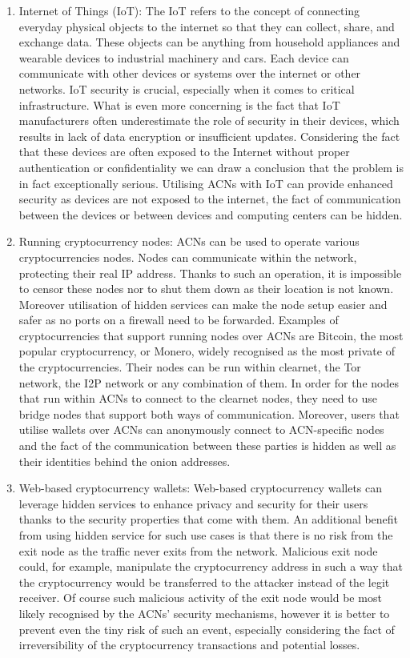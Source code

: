 \begin{enumerate}
    \item Internet of Things (IoT): The IoT refers to the concept of connecting everyday physical objects to the internet so that they can collect, share, and exchange data. These objects can be anything from household appliances and wearable devices to industrial machinery and cars. Each device can communicate with other devices or systems over the internet or other networks. IoT security is crucial, especially when it comes to critical infrastructure. What is even more concerning is the fact that IoT manufacturers often underestimate the role of security in their devices, which results in lack of data encryption or insufficient updates. Considering the fact that these devices are often exposed to the Internet without proper authentication or confidentiality we can draw a conclusion that the problem is in fact exceptionally serious.
    Utilising ACNs with IoT can provide enhanced security as devices are not exposed to the internet, the fact of communication between the devices or between devices and computing centers can be hidden.
    \item Running cryptocurrency nodes: ACNs can be used to operate various cryptocurrencies nodes. Nodes can communicate within the network, protecting their real IP address. Thanks to such an operation, it is impossible to censor these nodes nor to shut them down as their location is not known. Moreover utilisation of hidden services can make the node setup easier and safer as no ports on a firewall need to be forwarded. Examples of cryptocurrencies that support running nodes over ACNs are Bitcoin, the most popular cryptocurrency, or Monero, widely recognised as the most private of the cryptocurrencies. Their nodes can be run within clearnet, the Tor network, the I2P network or any combination of them. In order for the nodes that run within ACNs to connect to the clearnet nodes, they need to use bridge nodes that support both ways of communication. Moreover, users that utilise wallets over ACNs can anonymously connect to ACN-specific nodes and the fact of the communication between these parties is hidden as well as their identities behind the onion addresses.
    \item Web-based cryptocurrency wallets: Web-based cryptocurrency wallets can leverage hidden services to enhance privacy and security for their users thanks to the security properties that come with them. An additional benefit from using hidden service for such use cases is that there is no risk from the exit node as the traffic never exits from the network. Malicious exit node could, for example, manipulate the cryptocurrency address in such a way that the cryptocurrency would be transferred to the attacker instead of the legit receiver. Of course such malicious activity of the exit node would be most likely recognised by the ACNs’ security mechanisms, however it is better to prevent even the tiny risk of such an event, especially considering the fact of irreversibility of the cryptocurrency transactions and potential losses.

\end{enumerate}
